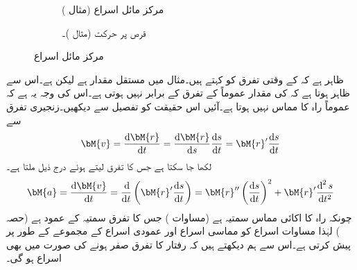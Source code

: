 \begin{figure}
\centering
\begin{subfigure}{0.45\textwidth}
\centering
{}
\caption{ مرکز مائل اسراع (مثال )}
\end{subfigure} \hfill
\begin{subfigure}{0.45\textwidth}
\centering
{}
\caption{ قرص پر حرکت (مثال )۔}
\end{subfigure} \hfill
\caption{مرکز مائل اسراع}
\label{شکل_مثال_الاحصاء_مرکز_مائل_اسراع}
\end{figure}


ظاہر ہے کہ  کے وقتی تفرق کو  کہتے ہیں۔مثال  میں  مستقل مقدار ہے  لیکن  ہے۔اس سے ظاہر ہوتا ہے کہ  کی مقدار عموماً   کے تفرق کے برابر نہیں ہوتی ہے۔اس کی وجہ یہ ہے کہ  عموماً راہ  کا مماس نہیں ہوتا ہے۔آئیں اس حقیقت کو تفصیل سے دیکھیں۔زنجیری تفرق سے 
\begin{align*}
\bM{v}=\frac{\dif \bM{r}}{\dif t}=\frac{\dif \bM{r}}{\dif s}\frac{\dif s}{\dif t}=\bM{r}'\frac{\dif s}{\dif t}
\end{align*}
لکھا جا سکتا ہے جس کا تفرق لیتے ہوئے درج ذیل ملتا ہے۔
\begin{align}\label{مساوات_الاحصاء_اجزاء_اسراع}
\bM{a}=\frac{\dif \bM{v}}{\dif t}=\frac{\dif}{\dif t}\left(\bM{r}'\frac{\dif s}{\dif t}\right)=\bM{r}''\left(\frac{\dif s}{\dif t}\right)^2+\bM{r}'\frac{\dif^{\,2} s}{\dif t^2}
\end{align}
چونکہ  راہ  کا اکائی مماس سمتیہ  ہے (مساوات ) جس کا تفرق  سمتیہ   کے عمود ہے (حصہ ) لہٰذا مساوات  اسراع کو مماسی اسراع  اور عمودی اسراع  کے مجموعے کے طور پر پیش کرتی ہے۔اس سے ہم دیکھتے ہیں کہ رفتار کا تفرق صفر ہونے کی صورت  میں بھی اسراع ہو گی۔

